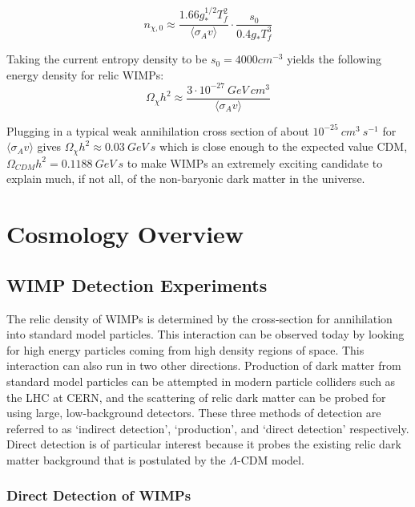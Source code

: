 \begin{equation}
n_{\chi,0} 
\approx
\frac{1.66 g_{*}^{1/2}T_{f}^{2}}{\langle \sigma_{A}v \rangle }
\cdot
\frac{s_{0}}{0.4 g_{*}T_{f}^{3}}
\end{equation} 

Taking the current entropy density to be $s_{0}=4000 cm^{-3}$ yields the following energy density for relic WIMPs:
\begin{equation}
\Omega_{\chi} h^{2}
\approx
\frac{3 \cdot 10^{-27} \ GeV \ cm^{3}}{\langle \sigma_{A}v \rangle}
\end{equation}

Plugging in a typical weak annihilation cross section of about $10^{-25} \ cm^{3} \ s^{-1}$ for $\langle \sigma_{A}v \rangle$ gives $\Omega_{\chi} h^{2} \approx 0.03 \ GeV \ s$ which is close enough to the expected value CDM, $\Omega_{CDM} h^{2} = 0.1188 \ GeV \ s$\cite{planck2015} to make WIMPs an extremely exciting candidate to explain much, if not all, of the non-baryonic dark matter in the universe\cite{susyDM,wimp2}.


\chapter{Cosmology Overview}
\section{WIMP Detection Experiments}
The relic density of WIMPs is determined by the cross-section for annihilation into standard model particles. This interaction can be observed today by looking for high energy particles coming from high density regions of space. This interaction can also run in two other directions. Production of dark matter from standard model particles can be attempted in modern particle colliders such as the LHC at CERN, and the scattering of relic dark matter can be probed for using large, low-background detectors. These three methods of detection are referred to as `indirect detection', `production', and `direct detection' respectively. Direct detection is of particular interest because it probes the existing relic dark matter background that is postulated by the $\Lambda$-CDM model.

\subsection{Direct Detection of WIMPs}

